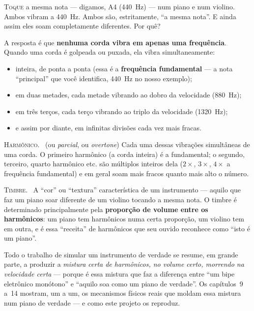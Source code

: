 \documentclass[11pt,oneside]{book}
\newcommand{\nova}[1]{\textsc{\color{accent}#1.}~}
\newcommand{\opening}[2]{\lettrine[lines=2,loversize=0.08,lraise=0.02]{#1}{#2}}
\begin{document}
\opening{T}{oque} a mesma nota --- digamos, A4 (440~Hz) --- num piano e num
violino. Ambos vibram a 440~Hz. Ambos são, estritamente, \enquote{a mesma
nota}. E ainda assim eles soam completamente diferentes. Por quê?

A resposta é que \textbf{nenhuma corda vibra em apenas uma frequência}.
Quando uma corda é golpeada ou puxada, ela vibra simultaneamente:

\begin{itemize}
\item inteira, de ponta a ponta (essa é a \textbf{frequência fundamental}
--- a nota \enquote{principal} que você identifica, 440~Hz no nosso
exemplo);
\item em duas metades, cada metade vibrando ao dobro da velocidade
(880~Hz);
\item em três terços, cada terço vibrando ao triplo da velocidade
(1320~Hz);
\item e assim por diante, em infinitas divisões cada vez mais fracas.
\end{itemize}

\begin{newword}
\nova{Harmônico} (ou \emph{parcial}, ou \emph{overtone}) Cada uma dessas
vibrações simultâneas de uma corda. O primeiro harmônico (a corda inteira)
é a fundamental; o segundo, terceiro, quarto harmônico etc. são múltiplos
inteiros dela ($2\times$, $3\times$, $4\times$ a frequência fundamental) e
em geral soam mais fracos quanto mais alto o número.
\end{newword}

\begin{newword}
\nova{Timbre} A \enquote{cor} ou \enquote{textura} característica de um
instrumento --- aquilo que faz um piano soar diferente de um violino
tocando a mesma nota. O timbre é determinado principalmente pela
\textbf{proporção de volume entre os harmônicos}: um piano tem harmônicos
numa certa proporção, um violino tem em outra, e é essa \enquote{receita}
de harmônicos que seu ouvido reconhece como \enquote{isto é um piano}.
\end{newword}

Todo o trabalho de simular um instrumento de verdade se resume, em grande
parte, a produzir a \emph{mistura certa de harmônicos, no volume certo,
morrendo na velocidade certa} --- porque é essa mistura que faz a diferença
entre \enquote{um bipe eletrônico monótono} e \enquote{aquilo soa como um
piano de verdade}. Os capítulos~9 a~14 mostram, um a um, os mecanismos
físicos reais que moldam essa mistura num piano de verdade --- e como este
projeto os reproduz.
\end{document}
